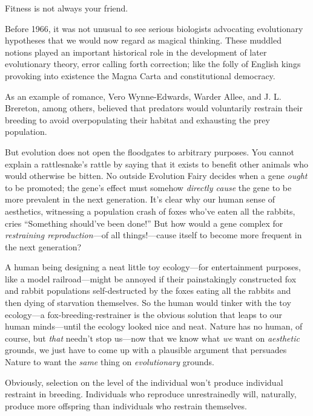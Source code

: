 {
 Fitness is not always your friend.}

\myendsectiontext


{
 Before 1966, it was not unusual to see serious biologists
advocating evolutionary hypotheses that we would now regard as magical
thinking. These muddled notions played an important historical role in
the development of later evolutionary theory, error calling forth
correction; like the folly of English kings provoking into existence
the Magna Carta and constitutional democracy. }

{
 As an example of romance, Vero Wynne-Edwards, Warder Allee, and J.
L. Brereton, among others, believed that predators would voluntarily
restrain their breeding to avoid overpopulating their habitat and
exhausting the prey population.}

{
 But evolution does not open the floodgates to arbitrary purposes.
You cannot explain a rattlesnake's rattle by saying
that it exists to benefit other animals who would otherwise be bitten.
No outside Evolution Fairy decides when a gene \textit{ought} to be
promoted; the gene's effect must somehow
\textit{directly cause} the gene to be more prevalent in the next
generation. It's clear why our human sense of
aesthetics, witnessing a population crash of foxes
who've eaten all the rabbits, cries
``Something should've been
done!'' But how would a gene complex for
\textit{restraining reproduction}{}---of all things!---cause itself to
become more frequent in the next generation?}

{
 A human being designing a neat little toy ecology---for
entertainment purposes, like a model railroad---might be annoyed if
their painstakingly constructed fox and rabbit populations
self-destructed by the foxes eating all the rabbits and then dying of
starvation themselves. So the human would tinker with the toy
ecology---a fox-breeding-restrainer is the obvious solution that leaps
to our human minds---until the ecology looked nice and neat. Nature has
no human, of course, but \textit{that} needn't stop
us---now that we know what \textit{we} want on \textit{aesthetic}
grounds, we just have to come up with a plausible argument that
persuades Nature to want the \textit{same} thing on
\textit{evolutionary} grounds.}

{
 Obviously, selection on the level of the individual
won't produce individual restraint in breeding.
Individuals who reproduce unrestrainedly will, naturally, produce more
offspring than individuals who restrain themselves.}

